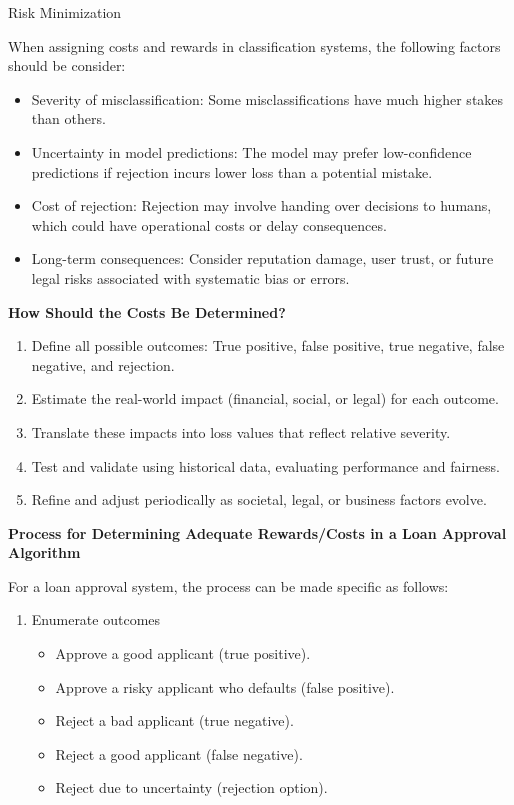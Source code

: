 \documentclass[
	english,
        solution=true
	]{tudaexercise}
\begin{document}
\begin{task}[points=11]{Risk Minimization}
\begin{subtask}[points=5]
\begin{solution}
When assigning costs and rewards in classification systems, the following factors should be consider:

\begin{itemize}
    \item Severity of misclassification: Some misclassifications have much higher stakes than others.
    \item Uncertainty in model predictions: The model may prefer low-confidence predictions if rejection incurs lower loss than a potential mistake.
    \item Cost of rejection: Rejection may involve handing over decisions to humans, which could have operational costs or delay consequences.
    \item Long-term consequences: Consider reputation damage, user trust, or future legal risks associated with systematic bias or errors.
\end{itemize}

\textbf{How Should the Costs Be Determined?}

\begin{enumerate}
    \item Define all possible outcomes: True positive, false positive, true negative, false negative, and rejection.
    \item Estimate the real-world impact (financial, social, or legal) for each outcome.
    \item Translate these impacts into loss values that reflect relative severity.
    \item Test and validate using historical data, evaluating performance and fairness.
    \item Refine and adjust periodically as societal, legal, or business factors evolve.
\end{enumerate}

\textbf{Process for Determining Adequate Rewards/Costs in a Loan Approval Algorithm}

For a loan approval system, the process can be made specific as follows:
\begin{enumerate}
    \item Enumerate outcomes
    \begin{itemize}
        \item Approve a good applicant (true positive).
        \item Approve a risky applicant who defaults (false positive).
        \item Reject a bad applicant (true negative).
        \item Reject a good applicant (false negative).
        \item Reject due to uncertainty (rejection option).
    \end{itemize}


\end{enumerate}
\end{solution}
\end{subtask}
\end{task}
\end{document}
